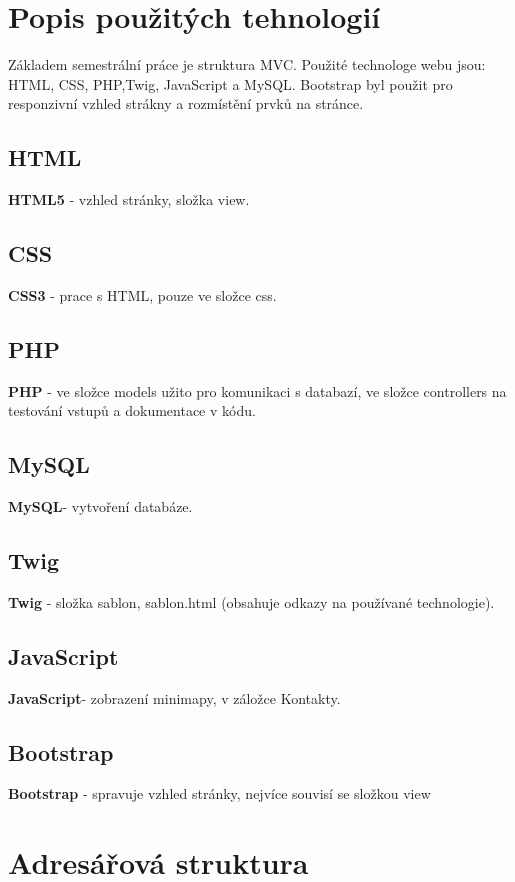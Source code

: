 \documentclass[12pt]{report}
\begin{document}
\chapter{Popis použitých tehnologií}
Základem semestrální práce je struktura MVC. Použité technologe webu jsou: HTML, CSS, PHP,Twig, JavaScript a MySQL. Bootstrap byl použit pro responzivní vzhled strákny a rozmístění prvků na stránce.

\section{HTML}
\textbf{HTML5} - vzhled stránky, složka view.

\section{CSS}
\textbf{CSS3} - prace s HTML, pouze ve složce css.

\section{PHP}
\textbf{PHP} - ve složce models užito pro komunikaci s databazí, ve složce controllers na testování vstupů a dokumentace v kódu.

\section{MySQL}
\textbf{MySQL}- vytvoření databáze.

\section{Twig}
\textbf{Twig} - složka sablon, sablon.html (obsahuje odkazy na používané technologie).

\section{JavaScript}
\textbf{JavaScript}- zobrazení minimapy, v  záložce Kontakty.

\section{Bootstrap}
\textbf{Bootstrap} - spravuje vzhled stránky, nejvíce souvisí se složkou view




\chapter{Adresářová struktura}
\end{document}
